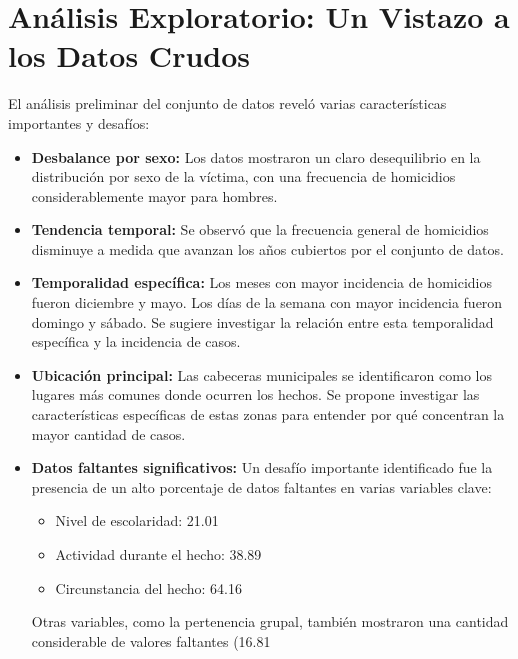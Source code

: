 \documentclass[lettersize,journal]{IEEEtran}
\begin{document}
\section{Análisis Exploratorio: Un Vistazo a los Datos Crudos}
El análisis preliminar del conjunto de datos reveló varias características importantes y desafíos:
\begin{itemize}
    \item \textbf{Desbalance por sexo:} Los datos mostraron un claro desequilibrio en la distribución por sexo de la víctima, con una frecuencia de homicidios considerablemente mayor para hombres.
    \item \textbf{Tendencia temporal:} Se observó que la frecuencia general de homicidios disminuye a medida que avanzan los años cubiertos por el conjunto de datos.
    \item \textbf{Temporalidad específica:} Los meses con mayor incidencia de homicidios fueron diciembre y mayo. Los días de la semana con mayor incidencia fueron domingo y sábado. Se sugiere investigar la relación entre esta temporalidad específica y la incidencia de casos.
    \item \textbf{Ubicación principal:} Las cabeceras municipales se identificaron como los lugares más comunes donde ocurren los hechos. Se propone investigar las características específicas de estas zonas para entender por qué concentran la mayor cantidad de casos.
    \item \textbf{Datos faltantes significativos:} Un desafío importante identificado fue la presencia de un alto porcentaje de datos faltantes en varias variables clave:
    \begin{itemize}
        \item Nivel de escolaridad: 21.01%
        \item Actividad durante el hecho: 38.89%
        \item Circunstancia del hecho: 64.16%
    \end{itemize}
    Otras variables, como la pertenencia grupal, también mostraron una cantidad considerable de valores faltantes (16.81%
\end{itemize}
\end{document}
